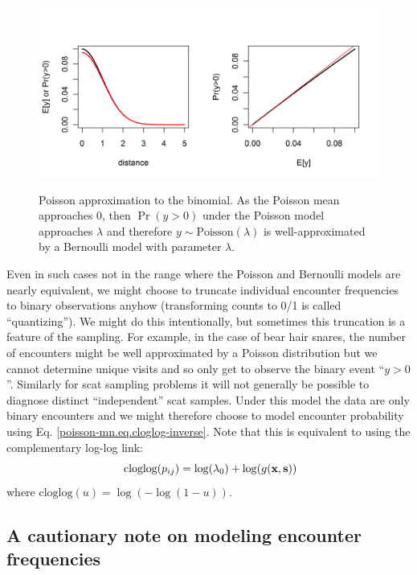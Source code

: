 \begin{figure}
\centering
\includegraphics[width=5in,height=2.5in]{Ch5-PoisMn/figs/Poisson-Bern.png}
\caption{
Poisson approximation to the binomial. As the Poisson mean
approaches 0, then $\Pr(y>0)$ under the Poisson model approaches
$\lambda$ and therefore $y \sim \mbox{Poisson}(\lambda)$ is
well-approximated by a Bernoulli model with parameter $\lambda$.  }
\label{poisson-mn.fig.poissonbern}
\end{figure}

Even in such cases not in the range where the Poisson and
Bernoulli models are nearly equivalent, we might choose to truncate
individual encounter frequencies to binary observations anyhow
(transforming counts to 0/1 is called ``quantizing'').  We might do this intentionally, but sometimes this
truncation is a feature of the sampling. For example, in the case of
bear hair snares, the number of encounters might be well approximated
by a Poisson distribution but we cannot determine unique visits and so
only get to observe the binary event ``$y>0$''. Similarly for scat
sampling problems it will not generally be possible to diagnose
distinct ``independent'' scat samples. Under this model the data are
only binary encounters and we might therefore choose to model
encounter probability
using Eq. \ref{poisson-mn.eq.cloglog-inverse}.
Note that this is equivalent to using the complementary log-log link:
\[
\mbox{ cloglog}(p_{ij}) = \log(\lambda_{0})  + \log(g({\bf x},{\bf s}))
\]
where $\mbox{cloglog}(u) = \log(-\log(1-u))$.

\subsection{A cautionary note on modeling encounter frequencies}

